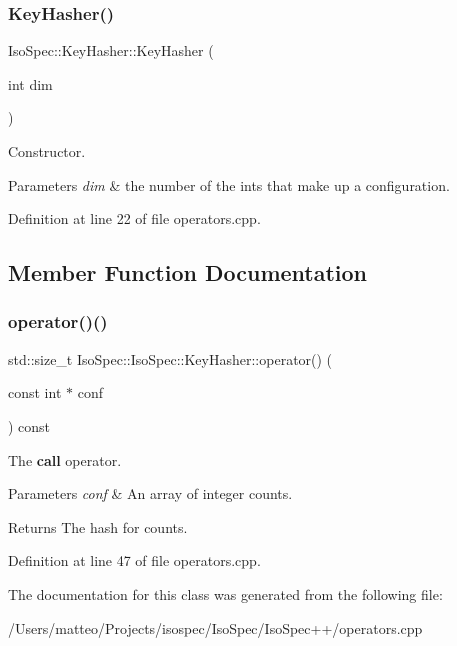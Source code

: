 \subsubsection{\texorpdfstring{Key\+Hasher()}{KeyHasher()}}
{\footnotesize\ttfamily Iso\+Spec\+::\+Key\+Hasher\+::\+Key\+Hasher (\begin{DoxyParamCaption}\item[{int}]{dim }\end{DoxyParamCaption})}



Constructor. 


\begin{DoxyParams}{Parameters}
{\em dim} & the number of the ints that make up a configuration. \\
\hline
\end{DoxyParams}


Definition at line 22 of file operators.\+cpp.



\subsection{Member Function Documentation}
\mbox{\label{class_iso_spec_1_1_iso_spec_1_1_key_hasher_a4e3d55fd75979e5b725ad0112052f046}} 
\subsubsection{\texorpdfstring{operator()()}{operator()()}}
{\footnotesize\ttfamily std\+::size\+\_\+t Iso\+Spec\+::\+Iso\+Spec\+::\+Key\+Hasher\+::operator() (\begin{DoxyParamCaption}\item[{const int $\ast$}]{conf }\end{DoxyParamCaption}) const\hspace{0.3cm}{\ttfamily [inline]}}



The {\bfseries call} operator. 


\begin{DoxyParams}{Parameters}
{\em conf} & An array of integer counts. \\
\hline
\end{DoxyParams}
\begin{DoxyReturn}{Returns}
The hash for counts. 
\end{DoxyReturn}


Definition at line 47 of file operators.\+cpp.



The documentation for this class was generated from the following file\+:\begin{DoxyCompactItemize}
\item 
/\+Users/matteo/\+Projects/isospec/\+Iso\+Spec/\+Iso\+Spec++/operators.\+cpp\end{DoxyCompactItemize}
